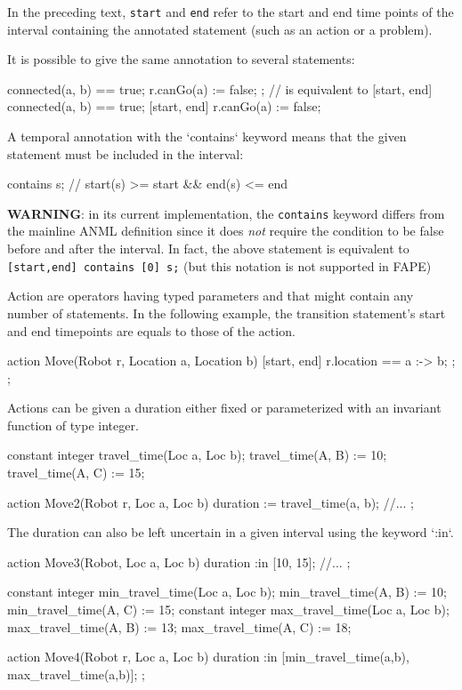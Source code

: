 In the preceding text, \lstinline!start! and \lstinline!end! refer to the start and end time
points of the interval containing the annotated statement (such as an action
or a problem).

It is possible to give the same annotation to several statements:
\begin{anmlcode}
 {
  connected(a, b) == true;
  r.canGo(a) := false;
};
// is equivalent to
[start, end] connected(a, b) == true;
[start, end] r.canGo(a) := false;
\end{anmlcode}


A temporal annotation with the `contains` keyword means that the given
statement must be included in the interval:
\begin{anmlcode}
 contains s;
// start(s) >= start && end(s) <= end
\end{anmlcode}
  
{\bf WARNING}: in its current implementation, the \lstinline!contains! keyword differs from the mainline ANML definition since it does \emph{not} require the condition to be false before and after the interval.
In fact, the above statement is equivalent to \lstinline![start,end] contains [0] s;! (but this notation is not supported in FAPE)



Action are operators having typed parameters and that might contain any number
of statements. In the following example, the transition statement's start and
end timepoints are equals to those of the action.
\begin{anmlcode}
action Move(Robot r, Location a, Location b) {
  [start, end] {
    r.location == a :-> b;
  };
};
\end{anmlcode}


Actions can be given a duration either fixed or parameterized with an invariant function of type integer.
\begin{anmlcode}
constant integer travel_time(Loc a, Loc b);
travel_time(A, B) := 10;
travel_time(A, C) := 15;

action Move2(Robot r, Loc a, Loc b) {
  duration := travel_time(a, b);
  //...
};
\end{anmlcode}
    
The duration can also be left uncertain in a given interval using the keyword `:in`.

\begin{anmlcode}
action Move3(Robot, Loc a, Loc b) {
  duration :in [10, 15];
  //...
};

constant integer min_travel_time(Loc a, Loc b);
min_travel_time(A, B) := 10;
min_travel_time(A, C) := 15;
constant integer max_travel_time(Loc a, Loc b);
max_travel_time(A, B) := 13;
max_travel_time(A, C) := 18;

action Move4(Robot r, Loc a, Loc b) {
  duration :in [min_travel_time(a,b), max_travel_time(a,b)];
};
\end{anmlcode}

